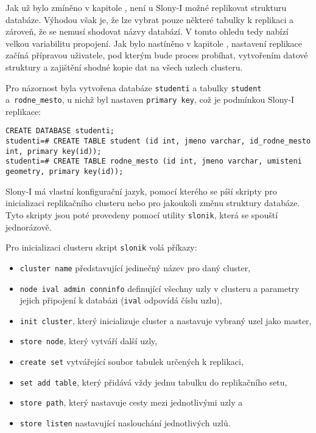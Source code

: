 Jak už bylo zmíněno v kapitole , není u Slony-I možné
replikovat strukturu databáze. Výhodou však je, že lze vybrat pouze některé
tabulky k replikaci a zároveň, že se nemusí shodovat názvy databází. V tomto
ohledu tedy nabízí velkou variabilitu propojení. Jak bylo nastíněno v kapitole
, nastavení replikace začíná přípravou uživatele, pod
kterým bude proces probíhat, vytvořením datové struktury a zajištění shodné
kopie dat na všech uzlech clusteru.

Pro názornost byla vytvořena databáze \texttt{studenti} a tabulky
\texttt{student} a~\texttt{rodne\_mesto}, u nichž byl nastaven \texttt{primary
key}, což je podmínkou Slony-I replikace:

\begin{lstlisting}
CREATE DATABASE studenti;
studenti=# CREATE TABLE student (id int, jmeno varchar, id_rodne_mesto int, primary key(id));
studenti=# CREATE TABLE rodne_mesto (id int, jmeno varchar, umisteni geometry, primary key(id));
\end{lstlisting}

Slony-I má vlastní konfigurační jazyk, pomocí kterého se píší skripty pro i\-ni\-ci\-a\-li\-za\-ci 
replikačního clusteru nebo pro jakoukoli změnu struktury databáze. Tyto skripty
jsou poté provedeny pomocí utility \texttt{slonik}, která se spouští
jednorázově.

Pro inicializaci clusteru skript \texttt{slonik} volá příkazy:
\begin{itemize}
  \item \texttt{cluster name} představující jedinečný název pro daný cluster,
  \item \texttt{node ival admin conninfo} definující všechny uzly v clusteru a
    parametry jejich připojení k databázi (\texttt{ival} odpovídá číslu uzlu),
  \item \texttt{init cluster}, který inicializuje cluster a nastavuje vybraný
    uzel jako master,
  \item \texttt{store node}, který vytváří další uzly,
  \item \texttt{create set} vytvářející soubor tabulek určených k replikaci,
  \item \texttt{set add table}, který přidává vždy jednu tabulku do replikačního
    setu,
  \item \texttt{store path}, který nastavuje cesty mezi jednotlivými uzly a
  \item \texttt{store listen} nastavující naslouchání jednotlivých uzlů.
\end{itemize}

